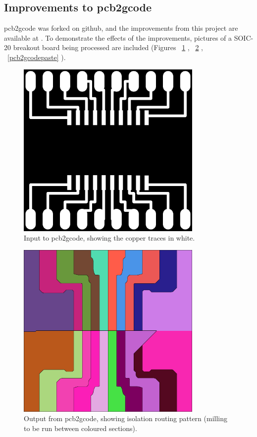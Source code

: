 \subsection{Improvements to pcb2gcode}
pcb2gcode was forked on github, and the improvements from this project are available at \cite{github}.
To demonstrate the effects of the improvements, pictures of a SOIC-20 breakout board being processed are included (Figures ~\ref{pcb2gcodeinput} , ~\ref{pcb2gcodeisolation} , ~\ref{pcb2gcodepaste} ).

\begin{figure}[ht!]
\centering
\includegraphics[width=90mm]{resources/breakout_copper.png}
\caption{Input to pcb2gcode, showing the copper traces in white.}
\label{pcb2gcodeinput}
\end{figure}

\begin{figure}[ht!]
\centering
\includegraphics[width=90mm]{resources/breakout_isolation.png}
\caption{Output from pcb2gcode, showing isolation routing pattern (milling to be run between coloured sections).}
\label{pcb2gcodeisolation}
\end{figure}

